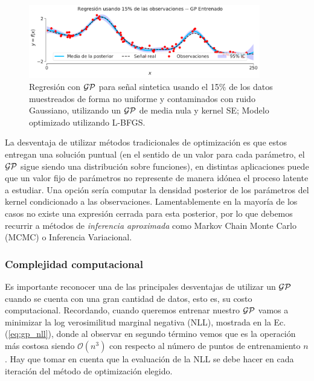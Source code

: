 \begin{figure}[H]
	\centering
	\includegraphics[width=0.9\textwidth]{img/cap8_entrenado}
	\caption{Regresión con $\mathcal{GP}$ para señal sintetica usando el 15$\%$ de los datos muestreados de forma no uniforme y contaminados con ruido Gaussiano, utilizando un $\mathcal{GP}$ de media nula y kernel SE; Modelo optimizado utilizando L-BFGS.}
	\label{fig:gp_5}
\end{figure}

La desventaja de utilizar métodos tradicionales de optimización es que estos entregan una solución puntual (en el sentido de un valor para cada parámetro, el $\mathcal{GP}$ sigue siendo una distribución sobre funciones), en distintas aplicaciones puede que un valor fijo de parámetros no represente de manera idónea el proceso latente a estudiar. Una opción sería computar la densidad posterior de los parámetros del kernel condicionado a las observaciones. Lamentablemente en la mayoría de los casos no existe una expresión cerrada para esta posterior, por lo que debemos recurrir a métodos de \textit{inferencia aproximada} como Markov Chain Monte Carlo (MCMC) o Inferencia Variacional.





\subsubsection{Complejidad computacional}

Es importante reconocer una de las principales desventajas de utilizar un $\mathcal{GP}$ cuando se cuenta con una gran cantidad de datos, esto es, su costo computacional.
Recordando, cuando queremos entrenar nuestro $\mathcal{GP}$ vamos a minimizar la log verosimilitud marginal negativa (NLL), mostrada en la Ec.(\ref{eq:gp_nll}), donde al observar en segundo término vemos que es la operación más costosa siendo $\mathcal{O}(n^3)$ con respecto al número de puntos de entrenamiento $n$. Hay que tomar en cuenta que la evaluación de la NLL se debe hacer en cada iteración del método de optimización elegido.

